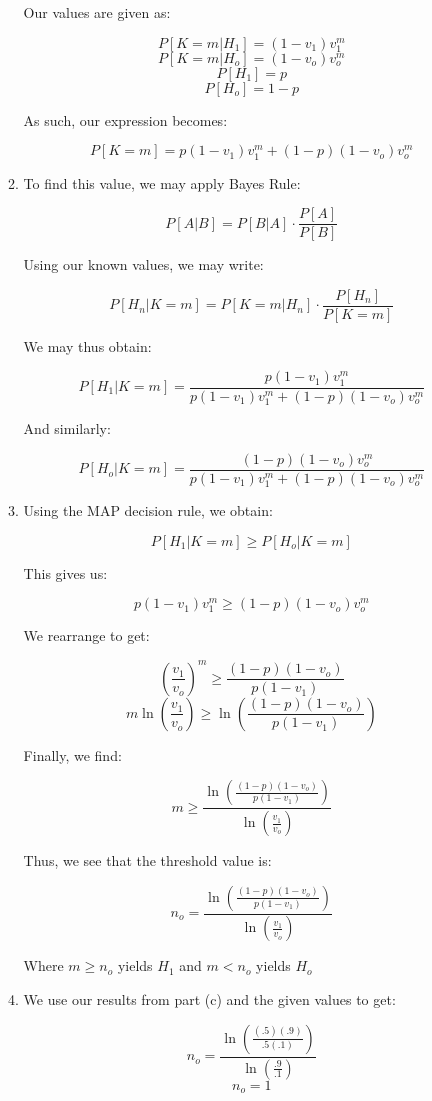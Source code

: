 \begin{enumerate}
\begin{enumerate}
        Our values are given as:

        $$P[K=m|H_1]=(1-v_1)v_1^m$$
        $$P[K=m|H_o]=(1-v_o)v_o^m$$
        $$P[H_1]=p$$
        $$P[H_o]=1-p$$

        As such, our expression becomes:

        $$\boxed{P[K=m]=p(1-v_1)v_1^m+(1-p)(1-v_o)v_o^m}$$

      \item To find this value, we may apply Bayes Rule:

        $$P[A|B]=P[B|A]\cdot\frac{P[A]}{P[B]}$$

        Using our known values, we may write:

        $$P[H_n|K=m]=P[K=m|H_n]\cdot\frac{P[H_n]}{P[K=m]}$$

        We may thus obtain:

        $$\boxed{P[H_1|K=m]=\frac{p(1-v_1)v_1^m}{p(1-v_1)v_1^m+(1-p)(1-v_o)v_o^m}}$$

        And similarly:

        $$\boxed{P[H_o|K=m]=\frac{(1-p)(1-v_o)v_o^m}{p(1-v_1)v_1^m+(1-p)(1-v_o)v_o^m}}$$

      \item Using the MAP decision rule, we obtain:

        $$P[H_1|K=m]\geq P[H_o|K=m]$$

        This gives us:

        $$p(1-v_1)v_1^m\geq (1-p)(1-v_o)v_o^m$$

        We rearrange to get:

        $$\left( \frac{v_1}{v_o} \right)^m\geq \frac{(1-p)(1-v_o)}{p(1-v_1)}$$
        $$m\ln\left( \frac{v_1}{v_o} \right)\geq \ln\left(\frac{(1-p)(1-v_o)}{p(1-v_1)}\right)$$

        Finally, we find:

        $$m\geq\frac{\ln\left(\frac{(1-p)(1-v_o)}{p(1-v_1)}\right)}{\ln\left( \frac{v_1}{v_o} \right)}$$

        Thus, we see that the threshold value is:

        $$\boxed{n_o=\frac{\ln\left(\frac{(1-p)(1-v_o)}{p(1-v_1)}\right)}{\ln\left( \frac{v_1}{v_o} \right)}}$$

        Where $m\geq n_o$ yields $H_1$ and $m<n_o$ yields $H_o$

      \item We use our results from part (c) and the given values to get:

        $$n_o=\frac{\ln\left(\frac{(.5)(.9)}{.5(.1)}\right)}{\ln\left( \frac{.9}{.1} \right)}$$
        $$\boxed{n_o=1}$$


\end{enumerate}
\end{enumerate}
